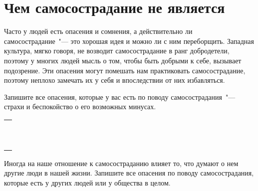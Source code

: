 
\chapter{Чем самосострадание не является} \label{What_Self-Compassion_Is_Not}

Часто у людей есть опасения и сомнения, а действительно ли самосострадание~"--- это хорошая идея и можно ли с ним переборщить. Западная культура, мягко говоря, не возводит самосострадание в ранг добродетели, поэтому у многих людей мысль о том, чтобы быть добрыми к себе, вызывает подозрение. Эти опасения могут помешать нам практиковать самосострадание, поэтому неплохо замечать их у себя и впоследствии от них избавляться.

\vspace{4ex}


\begin{itemize}
	\itemWritingHand Запишите все опасения, которые у вас есть по поводу самосострадания~"--- страхи и беспокойство о его возможных минусах.
	
\end{itemize}

\setlength{\extrarowheight}{2mm}
\begin{tabularx}{\textwidth}{X}
	\\
	\arrayrulecolor{gray}\hline\\
	\hline\\
	\hline\\
	\hline\\
	\hline\\
	\hline\\
	\hline\\
	\hline\\
	\hline\\
	\hline\\
	\hline\\	
\end{tabularx}
\setlength{\extrarowheight}{0mm}

Иногда на наше отношение к самосостраданию влияет то, что думают о нем другие люди в нашей жизни. Запишите все опасения по поводу самосострадания, которые есть у других людей или у общества в целом.


